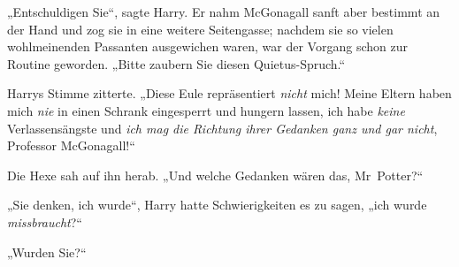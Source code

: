 „Entschuldigen Sie“, sagte Harry. Er nahm McGonagall sanft aber bestimmt an der Hand und zog sie in eine weitere Seitengasse; nachdem sie so vielen wohlmeinenden Passanten ausgewichen waren, war der Vorgang schon zur Routine geworden. „Bitte zaubern Sie diesen Quietus-Spruch.“


Harrys Stimme zitterte. „Diese Eule repräsentiert \emph{nicht} mich! Meine Eltern haben mich \emph{nie} in einen Schrank eingesperrt und hungern lassen, ich habe \emph{keine} Verlassensängste und \emph{ich mag die Richtung ihrer Gedanken ganz und gar nicht}, Professor McGonagall!“

Die Hexe sah auf ihn herab. „Und welche Gedanken wären das, Mr~Potter?“

„Sie denken, ich wurde“, Harry hatte Schwierigkeiten es zu sagen, „ich wurde \emph{missbraucht}?“

„Wurden Sie?“

